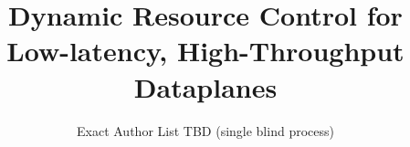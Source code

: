 \documentclass[letterpaper,twocolumn,10pt]{article}
\begin{document}

\title{\Large \bf Dynamic Resource Control for Low-latency, High-Throughput Dataplanes}

\author{Exact Author List TBD (single blind process)}


\maketitle

\thispagestyle{empty}





\end{document}

